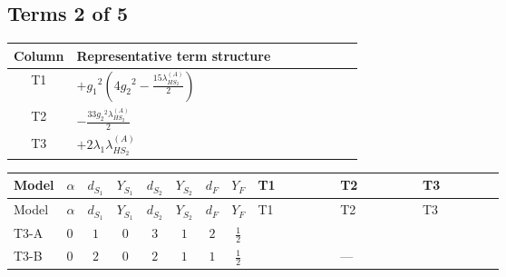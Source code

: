 \documentclass[8pt]{article}
\begin{document}
\begin{landscape}
\subsection*{Terms 2 of 5}
\begin{center}
\begin{tabular}{@{}c >{\raggedright\arraybackslash}p{0.82\linewidth}@{}}
\toprule
Column & Representative term structure \\
\midrule
T1 & \(\displaystyle +{g_1}^2 \left(4 {g_2}^2-\frac{15 {\lambda_{HS_2}^{(A)}}}{2}\right)\) \\
\midrule
T2 & \(\displaystyle -\frac{33 {g_2}^2 {\lambda_{HS_2}^{(A)}}}{2}\) \\
\midrule
T3 & \(\displaystyle +2 {\lambda_1} {\lambda_{HS_2}^{(A)}}\) \\
\midrule
\bottomrule
\end{tabular}
\end{center}
\smallskip
\tiny
\begin{longtable}{@{}llcccccc >{\raggedright\arraybackslash}p{0.21\linewidth} >{\raggedright\arraybackslash}p{0.21\linewidth} >{\raggedright\arraybackslash}p{0.21\linewidth}@{}}
\toprule
Model & $\alpha$ & $d_{S_1}$ & $Y_{S_1}$ & $d_{S_2}$ & $Y_{S_2}$ & $d_F$ & $Y_F$ & T1 & T2 & T3 \\
\midrule
\endfirsthead
\toprule
Model & $\alpha$ & $d_{S_1}$ & $Y_{S_1}$ & $d_{S_2}$ & $Y_{S_2}$ & $d_F$ & $Y_F$ & T1 & T2 & T3 \\
\midrule
\endhead
T3-A & $0$ & $1$ & $0$ & $3$ & $1$ & $2$ & $\frac{1}{2}$ & \scriptsize\adjustbox{max width=\linewidth}{$\begin{gathered} +{g_1}^2 \left(4 {g_2}^2-\frac{15 {\lambda_{HS_2}^{(A)}}}{2}\right)\end{gathered}$} & \scriptsize\adjustbox{max width=\linewidth}{$\begin{gathered} -\frac{33 {g_2}^2 {\lambda_{HS_2}^{(A)}}}{2}\end{gathered}$} & \scriptsize\adjustbox{max width=\linewidth}{$\begin{gathered} +2 {\lambda_1} {\lambda_{HS_2}^{(A)}}\end{gathered}$} \\
\midrule
T3-B & $0$ & $2$ & $0$ & $2$ & $1$ & $1$ & $\frac{1}{2}$ & \scriptsize\adjustbox{max width=\linewidth}{$\begin{gathered} +{g_1}^2 \left(12 {g_2}^2-\frac{15 {\lambda_{HS_2}^{(A)}}}{2}\right)\end{gathered}$} & --- & \scriptsize\adjustbox{max width=\linewidth}{$\begin{gathered} +2 {\lambda_1} {\lambda_{HS_2}^{(A)}}\end{gathered}$} \\

\end{longtable}
\end{landscape}
\end{document}
